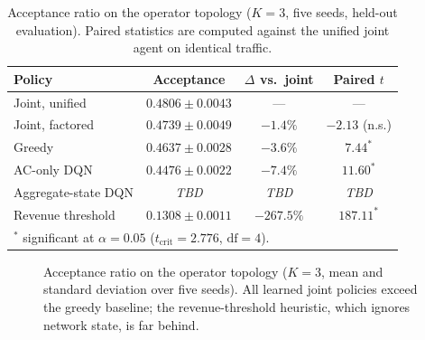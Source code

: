 \documentclass[10pt,journal,comsoc]{IEEEtran}
\begin{document}
\begin{table}[t]
\centering
\caption{Acceptance ratio on the operator topology ($K=3$, five seeds,
held-out evaluation). Paired statistics are computed against the unified
joint agent on identical traffic.}
\label{tab:main}
\renewcommand{\arraystretch}{1.2}
\begin{tabular}{lccc}
\toprule
\textbf{Policy} & \textbf{Acceptance} & \textbf{$\Delta$ vs.\ joint} & \textbf{Paired $t$} \\
\midrule
Joint, unified      & $\mathbf{0.4806 \pm 0.0043}$ & --- & --- \\
Joint, factored     & $0.4739 \pm 0.0049$ & $-1.4\%$ & $-2.13$ (n.s.) \\
Greedy              & $0.4637 \pm 0.0028$ & $-3.6\%$ & $7.44^{*}$ \\
AC-only DQN         & $0.4476 \pm 0.0022$ & $-7.4\%$ & $11.60^{*}$ \\
Aggregate-state DQN & \textit{TBD} & \textit{TBD} & \textit{TBD} \\
Revenue threshold   & $0.1308 \pm 0.0011$ & $-267.5\%$ & $187.11^{*}$ \\
\bottomrule
\multicolumn{4}{l}{\footnotesize $^{*}$ significant at $\alpha=0.05$ ($t_{\text{crit}}=2.776$, $\mathrm{df}=4$).}
\end{tabular}
\end{table}

\begin{figure}[t]
\centering
{}
\caption{Acceptance ratio on the operator topology ($K=3$, mean and
standard deviation over five seeds). All learned joint policies exceed
the greedy baseline; the revenue-threshold heuristic, which ignores
network state, is far behind.}
\label{fig:main}
\end{figure}
\end{document}
